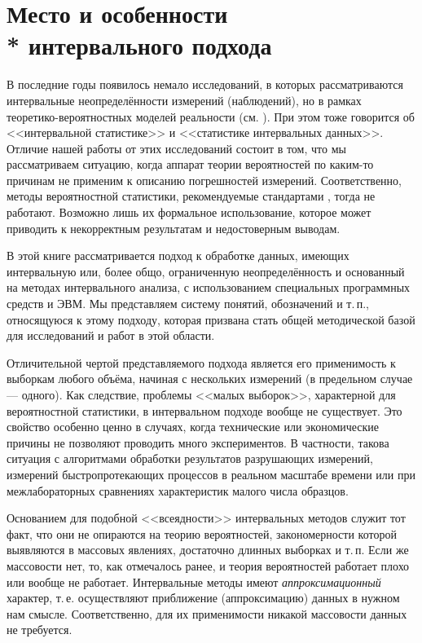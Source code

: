 \documentclass[a5paper,openany]{book}
\begin{document}
  
\section[Место и особенности интервального подхода]%
        {Место и особенности \\* интервального подхода} 
  
  
В последние годы появилось немало исследований, в которых рассматриваются интервальные 
неопределённости измерений (наблюдений), но в рамках теоретико-вероятностных моделей 
реальности (см. \cite{LemeshkoPostovalov, Orlov2006, OrlovLutsenko, BillardDiday}). 
При этом тоже говорится об <<интервальной статистике>> и <<статистике интервальных 
данных>>. Отличие нашей работы от этих исследований состоит в том, что мы рассматриваем 
ситуацию, когда аппарат теории вероятностей по каким-то причинам не применим к описанию 
погрешностей измерений. Соответственно, методы вероятностной статистики, рекомендуемые 
стандартами \cite{GUM, JCGM102RU}, тогда не работают. Возможно лишь их формальное 
использование, которое может приводить к некорректным результатам и недостоверным 
выводам. 
  
В этой книге рассматривается подход к обработке данных, имеющих интервальную 
или, более общо, ограниченную неопределённость и основанный на методах интервального 
анализа, с использованием специальных программных средств и ЭВМ. Мы представляем 
систему понятий, обозначений и т.\,п., относящуюся к этому подходу, которая призвана 
стать общей методической базой для исследований и работ в этой области. 
  
Отличительной чертой представляемого подхода является его применимость к выборкам 
любого объёма, начиная с нескольких измерений (в предельном случае --- одного). 
Как следствие, проблемы <<малых выборок>>, характерной для вероятностной статистики, 
в интервальном подходе вообще не существует. Это свойство особенно ценно в случаях, 
когда технические или экономические причины не позволяют проводить много экспериментов. 
В частности, такова ситуация с алгоритмами обработки результатов разрушающих 
измерений, измерений быстропротекающих процессов в реальном масштабе времени 
или при межлабораторных  сравнениях характеристик малого числа образцов. 
  
Основанием для подобной <<всеядности>> интервальных методов служит тот факт, что они 
не опираются на теорию вероятностей, закономерности которой выявляются в массовых 
явлениях, достаточно длинных выборках и т.\,п. Если же массовости нет, то, как 
отмечалось ранее, и теория вероятностей работает плохо или вообще не работает. 
Интервальные методы имеют \emph{аппроксимационный} характер, т.\,е. осуществляют 
приближение (аппроксимацию) данных в нужном нам смысле. Соответственно, для 
их применимости никакой массовости данных не требуется.  
  
\end{document}
